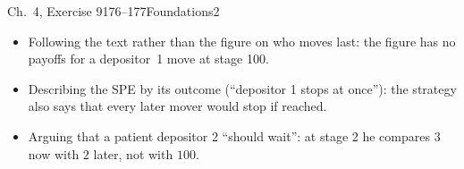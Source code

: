 \begin{exsol}{\MG{} Ch.~4, Exercise 9}{176--177}{Foundations}{2}
\mistakes
\begin{itemize}
  \item Following the text rather than the figure on who moves last: the figure has no payoffs for a
  depositor~1 move at stage 100.
  \item Describing the SPE by its outcome (``depositor 1 stops at once''): the strategy also says that
  every later mover would stop if reached.
  \item Arguing that a patient depositor 2 ``should wait'': at stage 2 he compares $3$ now with $2$ later,
  not with $100$.
\end{itemize}

\end{exsol}
